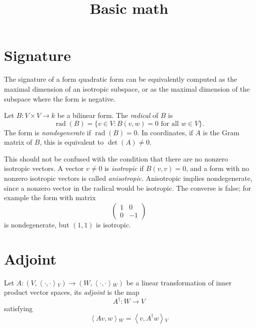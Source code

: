 



\title{Basic math}
\maketitle

\label{section-phantom}

\tableofcontents

\section{Signature}
\label{section-signature}

The signature of a form quadratic form can be
equivalently computed as the
maximal dimension of an isotropic subspace,
or as the maximal dimension of the
subspace where the form is negative.

\begin{remark}
\label{remark-nondegenerate-vs-anisotropic}
Let $B:V \times V \to k$ be a bilinear form.
The {\it radical} of $B$ is
$$
\operatorname{rad}(B)=
\{v \in V : B(v,w)=0\text{ for all }w
\in V\}.
$$
The form is {\it nondegenerate} if
$\operatorname{rad}(B)=0$. In coordinates,
if $A$ is the Gram matrix of $B$, this is
equivalent to $\det(A)\neq 0$.

This should not be confused with the
condition that there are no nonzero isotropic
vectors. A vector $v\neq 0$ is {\it
isotropic} if $B(v,v)=0$, and a form with no
nonzero isotropic vectors is called
{\it anisotropic}. Anisotropic implies
nondegenerate, since a nonzero vector in the
radical would be isotropic. The converse is
false; for example the form with matrix
$$
\begin{pmatrix}
1&0\\
0&-1
\end{pmatrix}
$$
is nondegenerate, but $(1,1)$ is isotropic.
\end{remark}

\section{Adjoint}
\label{section-adjoint}

\begin{definition}
\label{definition-adjoint}
Let  $A:(V,\left\langle{}\cdot,\cdot\right\rangle{}_V) \to
(W,\left\langle{}\cdot,\cdot\right\rangle{}_W)$ be a
linear transformation of inner product vector
spaces, its {\it adjoint} is the
map
$$
A^{\dag}:W\to V
$$
satisfying
\begin{equation}
\label{equation-adjoint}
\left\langle{}Av,w\right\rangle{}_W=\left\langle{}v,A^\dag w\right\rangle{}_V
\end{equation}
\end{definition}

